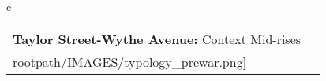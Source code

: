 \begin{table}[H]
        \begin{tabular}{c}
        \begin{tabular}{m{1.5in} m{2in}}
\textbf{Taylor Street-Wythe Avenue:} {Context Mid-rises} & \texttt{[image: \\rootpath/IMAGES/typology\_prewar.png]}
\end{tabular}\end{tabular}
        \end{table}